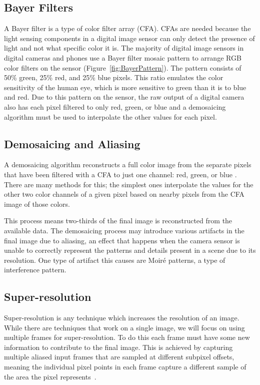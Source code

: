 \documentclass{sig-alternate}
\begin{document}
\subsection{Bayer Filters}
\label{sec:background:bayerFilter}

A Bayer filter is a type of color filter array (CFA). CFAs are needed because the light sensing components in a digital image sensor can only detect the presence of light and not what specific color it is. The majority of digital image sensors in digital cameras and phones use a Bayer filter mosaic pattern to arrange RGB color filters on the sensor (Figure~\ref{fig:BayerPattern}). The pattern consists of 50\% green, 25\% red, and 25\% blue pixels. This ratio emulates the color sensitivity of the human eye, which is more sensitive to green than it is to blue and red. Due to this pattern on the sensor, the raw output of a digital camera also has each pixel filtered to only red, green, or blue and a demosaicing algorithm must be used to interpolate the other values for each pixel.~\cite{wiki:BayerFilter}



\subsection{Demosaicing and Aliasing}
\label{sec:background:demosaicing}

A demosaicing algorithm reconstructs a full color image from the separate pixels that have been filtered with a CFA to just one channel: red, green, or blue \cite{wiki:Demosaicing}. There are many methods for this; the simplest ones interpolate the values for the other two color channels of a given pixel based on nearby pixels from the CFA image of those colors.

This process means two-thirds of the final image is reconstructed from the available data. The demosaicing process may introduce various artifacts in the final image due to aliasing, an effect that happens when the camera sensor is unable to correctly represent the patterns and details present in a scene due to its resolution. One type of artifact this causes are Moiré patterns, a type of interference pattern.~\cite{blog:Wronski2018}


\subsection{Super-resolution}
\label{sec:background:superResolution}

Super-resolution is any technique which increases the resolution of an image. While there are techniques that work on a single image, we will focus on using multiple frames for super-resolution. To do this each frame must have some new information to contribute to the final image.
This is achieved by capturing multiple aliased input frames that are sampled at different subpixel offsets, meaning the individual pixel points in each frame capture a different sample of the area the pixel represents~\cite{Wronski2019}. 
\end{document}
